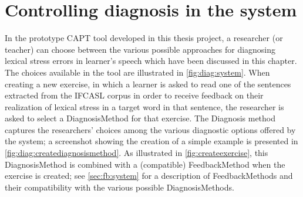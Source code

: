 %

\section{Controlling diagnosis in the system}
\label{sec:diag:system}

	In the prototype CAPT tool developed in this thesis project, a  researcher (or teacher) can choose between the various possible approaches for diagnosing lexical stress errors in learner's speech which have been discussed in this chapter. The choices available in the tool are illustrated in \cref{fig:diag:system}. When creating a new exercise, in which a learner is asked to read one of the sentences extracted from the IFCASL corpus  in order to receive feedback on their realization of lexical stress in a target word in that sentence, the researcher is asked to select a DiagnosisMethod for that exercise. The Diagnosis method captures the researchers' choices among the various diagnostic options offered by the system; a screenshot showing the creation of a simple example is presented in \cref{fig:diag:creatediagnosismethod}. As illustrated in \cref{fig:createexercise}, this DiagnosisMethod is combined with a (compatible) FeedbackMethod when the exercise is created; see \cref{sec:fb:system} for a description of FeedbackMethods and their compatibility with the various possible DiagnosisMethods. 
	
